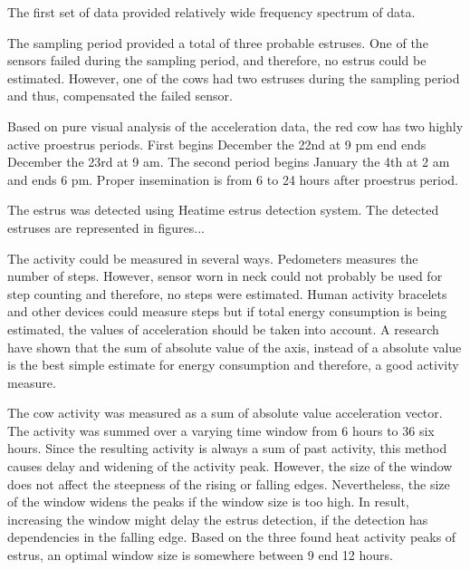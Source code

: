 \documentclass[english,12pt,a4paper,pdftex,elec,utf8]{aaltothesis}
\begin{document}
The first set of data provided relatively wide frequency spectrum of data.



The sampling period provided a total of three probable estruses. One of the sensors failed during the sampling period, and therefore, no estrus could be estimated. However, one of the cows had two estruses during the sampling period and thus, compensated the failed sensor.

Based on pure visual analysis of the acceleration data, the red cow has two highly active proestrus periods. First begins December the 22nd at 9 pm end ends December the 23rd at 9 am. The second period begins January the 4th at 2 am and ends 6 pm. Proper insemination is from 6 to 24 hours after proestrus period.

The estrus was detected using Heatime estrus detection system. The detected estruses are represented in figures...

%






The activity could be measured in several ways. Pedometers measures the number of steps. However, sensor worn in neck could not probably be used for step counting and therefore, no steps were estimated. Human activity bracelets and other devices could measure steps but if total energy consumption is being estimated, the values of acceleration should be taken into account. A research have shown that the sum of absolute value of the axis, instead of a absolute value is the best simple estimate for energy consumption and therefore, a good activity measure.

The cow activity was measured as a sum of absolute value acceleration vector. The activity was summed over a varying time window from 6 hours to 36 six hours. Since the resulting activity is always a sum of past activity, this method causes delay and widening of the activity peak. However, the size of the window does not affect the steepness of the rising or falling edges. Nevertheless, the size of the window widens the peaks if the window size is too high. In result, increasing the window might delay the estrus detection, if the detection has dependencies in the falling edge. Based on the three found heat activity peaks of estrus, an optimal window size is somewhere between 9 end 12 hours.
\end{document}
